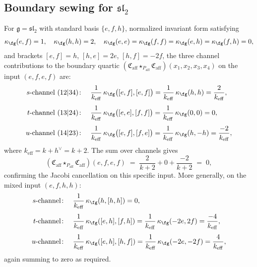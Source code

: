\subsection{Boundary sewing for \texorpdfstring{$\mathfrak{sl}_2$}{sl(2)}}
\label{subsec:affine-sl2-boundary-sewing}

\begin{proposition}\label{prop:affine-sl2-boundary-quartic}
For $\mathfrak{g} = \mathfrak{sl}_2$ with standard basis
$\{e,f,h\}$, normalized invariant form satisfying
\begin{equation}\label{eq:sl2-killing-values}
\kappa_{\fg}(e,f) = 1, \quad
\kappa_{\fg}(h,h) = 2, \quad
\kappa_{\fg}(e,e) = \kappa_{\fg}(f,f) = \kappa_{\fg}(e,h) = \kappa_{\fg}(f,h) = 0,
\end{equation}
and brackets $[e,f] = h$, $[h,e] = 2e$, $[h,f] = -2f$,
the three channel contributions to the boundary quartic
$(\mathfrak{C}_{\mathrm{aff}} \star_{P_{\mathrm{aff}}}
\mathfrak{C}_{\mathrm{aff}})(x_1,x_2,x_3,x_4)$
on the input $(e,f,e,f)$ are:
\begin{align}
\textup{$s$-channel } (12|34)\colon\quad
&\frac{1}{k_{\mathrm{eff}}}\,
\kappa_{\fg}\bigl([e,f],[e,f]\bigr)
= \frac{1}{k_{\mathrm{eff}}}\,\kappa_{\fg}(h,h)
= \frac{2}{k_{\mathrm{eff}}},
\label{eq:sl2-s-channel}
\\[4pt]
\textup{$t$-channel } (13|24)\colon\quad
&\frac{1}{k_{\mathrm{eff}}}\,
\kappa_{\fg}\bigl([e,e],[f,f]\bigr)
= \frac{1}{k_{\mathrm{eff}}}\,\kappa_{\fg}(0,0)
= 0,
\label{eq:sl2-t-channel}
\\[4pt]
\textup{$u$-channel } (14|23)\colon\quad
&\frac{1}{k_{\mathrm{eff}}}\,
\kappa_{\fg}\bigl([e,f],[f,e]\bigr)
= \frac{1}{k_{\mathrm{eff}}}\,\kappa_{\fg}(h,-h)
= \frac{-2}{k_{\mathrm{eff}}},
\label{eq:sl2-u-channel}
\end{align}
where $k_{\mathrm{eff}} = k + h^\vee = k + 2$.
The sum over channels gives
\begin{equation}\label{eq:sl2-boundary-quartic-sum}
(\mathfrak{C}_{\mathrm{aff}} \star_{P_{\mathrm{aff}}}
\mathfrak{C}_{\mathrm{aff}})(e,f,e,f)
\;=\;
\frac{2}{k+2} + 0 + \frac{-2}{k+2}
\;=\; 0,
\end{equation}
confirming the Jacobi cancellation on this specific input.
More generally, on the mixed input $(e,f,h,h)$:
\begin{align}
\textup{$s$-channel}\colon\quad
&\frac{1}{k_{\mathrm{eff}}}\,
\kappa_{\fg}(h,[h,h]) = 0,
\label{eq:sl2-mixed-s}
\\[4pt]
\textup{$t$-channel}\colon\quad
&\frac{1}{k_{\mathrm{eff}}}\,
\kappa_{\fg}([e,h],[f,h])
= \frac{1}{k_{\mathrm{eff}}}\,
\kappa_{\fg}(-2e,2f)
= \frac{-4}{k_{\mathrm{eff}}},
\label{eq:sl2-mixed-t}
\\[4pt]
\textup{$u$-channel}\colon\quad
&\frac{1}{k_{\mathrm{eff}}}\,
\kappa_{\fg}([e,h],[h,f])
= \frac{1}{k_{\mathrm{eff}}}\,
\kappa_{\fg}(-2e,-2f)
= \frac{4}{k_{\mathrm{eff}}},
\label{eq:sl2-mixed-u}
\end{align}
again summing to zero as required.
\end{proposition}

